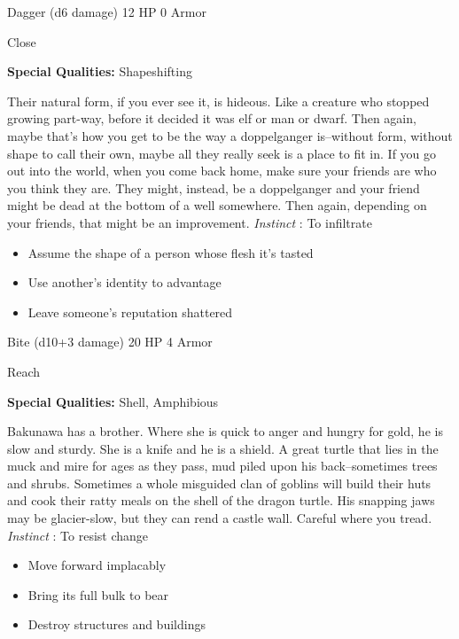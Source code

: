 

 Dagger (d6 damage) 12 HP 0 Armor


 Close


 \textbf{Special Qualities:}
 Shapeshifting


Their natural form, if you ever see it, is hideous. Like a creature who stopped growing part-way, before it decided it was elf or man or dwarf. Then again, maybe that's how you get to be the way a doppelganger is--without form, without shape to call their own, maybe all they really seek is a place to fit in. If you go out into the world, when you come back home, make sure your friends are who you think they are. They might, instead, be a doppelganger and your friend might be dead at the bottom of a well somewhere. Then again, depending on your friends, that might be an improvement. \emph{Instinct}
: To infiltrate
\begin{itemize}
\item Assume the shape of a person whose flesh it's tasted
\item Use another's identity to advantage
\item Leave someone's reputation shattered

\end{itemize}




 Bite (d10+3 damage) 20 HP 4 Armor


 Reach


 \textbf{Special Qualities:}
 Shell, Amphibious


 Bakunawa has a brother. Where she is quick to anger and hungry for gold, he is slow and sturdy. She is a knife and he is a shield. A great turtle that lies in the muck and mire for ages as they pass, mud piled upon his back--sometimes trees and shrubs. Sometimes a whole misguided clan of goblins will build their huts and cook their ratty meals on the shell of the dragon turtle. His snapping jaws may be glacier-slow, but they can rend a castle wall. Careful where you tread. \emph{Instinct}
: To resist change
\begin{itemize}
\item Move forward implacably
\item Bring its full bulk to bear
\item Destroy structures and buildings

\end{itemize}


